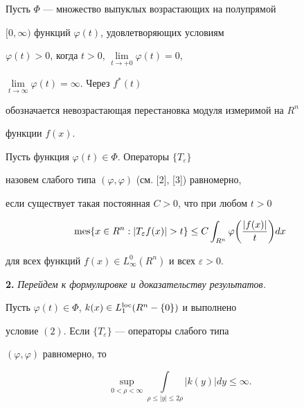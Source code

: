 Пусть $\Phi$ --- множество выпуклых возрастающих на полупрямой 


$[0,\infty)$ функций $\varphi(t)$, удовлетворяющих условиям 


$\varphi(t)>0$, когда $t>0$, $\lim\limits_{t\to+0}\varphi(t)=0$, 


$\lim\limits_{t\to\infty}\varphi(t)=\infty$. Через $f^*(t)$ 


обозначается невозрастающая перестановка модуля измеримой на $R^n$ 


функции $f(x)$. 


 


\begin{defnnonum} 


Пусть функция $\varphi(t)\in\Phi$. Операторы $\{T_\varepsilon\}$ 


назовем слабого типа $(\varphi,\varphi)$ (см. [2], [3]) равномерно, 


если существует такая постоянная $C>0$, что при любом $t>0$ 


$$ 


\mes\{x\in R^n:|T_\varepsilon f(x)|>t\}\le C 


\int_{R^n}\varphi\bigg(\frac{|f(x)|}{t} \bigg)dx 


$$ 


для всех функций $f(x)\in L^0_\infty(R^n)$ и всех $\varepsilon>0$. 


\end{defnnonum} 


 


{\bf 2.} {\it Перейдем к формулировке и доказательству результатов.} 


 


\begin{thm} 


Пусть $\varphi(t)\in \Phi$, $k(x)\in L^{\operatorname{loc}}_1(R^n-\{0\})$ и выполнено 


условие $(2)$. Если $\{T_\varepsilon\}$ --- операторы слабого типа 


$(\varphi,\varphi)$ равномерно, то 


\begin{equation} 


\sup_{0<\rho<\infty}\int\limits_{\rho\le|y|\le2\rho} 


|k(y)|d y\le\infty. 


\end{equation} 


\end{thm} 


